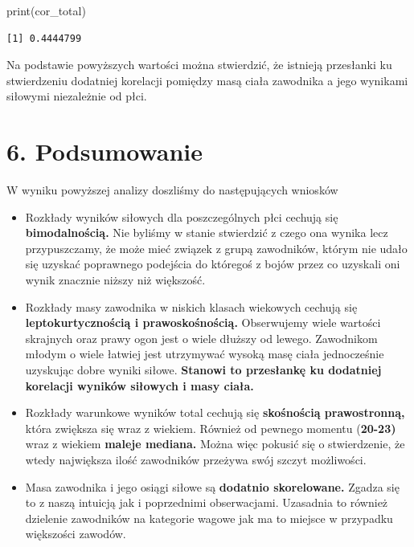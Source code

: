 \documentclass[
  letterpaper,
  DIV=11,
  numbers=noendperiod]{scrartcl}
\newenvironment{Shaded}{\begin{snugshade}}{\end{snugshade}}
\newcommand{\FunctionTok}[1]{\textcolor[rgb]{0.28,0.35,0.67}{#1}}
\newcommand{\NormalTok}[1]{\textcolor[rgb]{0.00,0.23,0.31}{#1}}
\begin{document}
\begin{Shaded}
\begin{Highlighting}[]
\FunctionTok{print}\NormalTok{(cor\_total)}
\end{Highlighting}
\end{Shaded}

\begin{verbatim}
[1] 0.4444799
\end{verbatim}

Na podstawie powyższych wartości można stwierdzić, że istnieją
przesłanki ku stwierdzeniu dodatniej korelacji pomiędzy masą ciała
zawodnika a jego wynikami siłowymi niezależnie od płci.

\hypertarget{podsumowanie}{%
\section{6. Podsumowanie}\label{podsumowanie}}

W wyniku powyższej analizy doszliśmy do następujących wniosków

\begin{itemize}
\item
  Rozkłady wyników siłowych dla poszczególnych płci cechują się
  \textbf{bimodalnością.} Nie byliśmy w stanie stwierdzić z czego ona
  wynika lecz przypuszczamy, że może mieć związek z grupą zawodników,
  którym nie udało się uzyskać poprawnego podejścia do któregoś z bojów
  przez co uzyskali oni wynik znacznie niższy niż większość.
\item
  Rozkłady masy zawodnika w niskich klasach wiekowych cechują się
  \textbf{leptokurtycznością i prawoskośnością.} Obserwujemy wiele
  wartości skrajnych oraz prawy ogon jest o wiele dłuższy od lewego.
  Zawodnikom młodym o wiele łatwiej jest utrzymywać wysoką masę ciała
  jednocześnie uzyskując dobre wyniki siłowe. \textbf{Stanowi to
  przesłankę ku dodatniej korelacji wyników siłowych i masy ciała.}
\item
  Rozkłady warunkowe wyników total cechują się \textbf{skośnością
  prawostronną,} która zwiększa się wraz z wiekiem. Również od pewnego
  momentu (\textbf{20-23)} wraz z wiekiem \textbf{maleje mediana.} Można
  więc pokusić się o stwierdzenie, że wtedy największa ilość zawodników
  przeżywa swój szczyt możliwości.
\item
  Masa zawodnika i jego osiągi siłowe są \textbf{dodatnio skorelowane.}
  Zgadza się to z naszą intuicją jak i poprzednimi obserwacjami.
  Uzasadnia to również dzielenie zawodników na kategorie wagowe jak ma
  to miejsce w przypadku większości zawodów.
\end{itemize}
\end{document}
